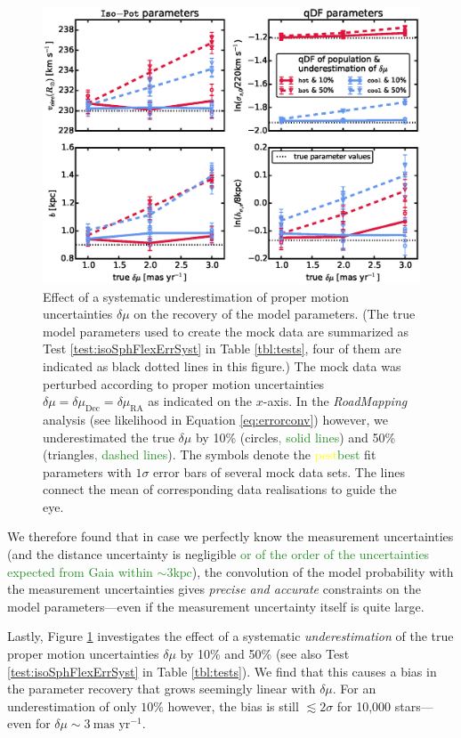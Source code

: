 \documentclass[iop,revtex4,numberedappendix,appendixfloats]{emulateapj}
\newcommand{\RM}{{\sl RoadMapping}}
\newcommand{\NEW}[1]{\textcolor{ForestGreen}{#1}}
\newcommand{\OLD}[1]{\textcolor{Yellow}{#1}}%
\begin{document}
\begin{figure}[!htbp]
\centering
\includegraphics[width=\columnwidth]{figs/isoSphFlexErrSyst_offset_vs_error.eps}
\caption{Effect of a systematic underestimation of proper motion uncertainties $\delta \mu$ on the recovery of the model parameters. (The true model parameters used to create the mock data are summarized as Test \ref{test:isoSphFlexErrSyst} in Table \ref{tbl:tests}, four of them are indicated as black dotted lines in this figure.) The mock data was perturbed according to proper motion uncertainties $\delta \mu = \delta \mu_\text{Dec} = \delta \mu_\text{RA}$ as indicated on the $x$-axis. In the \RM{} analysis (see likelihood in Equation \eqref{eq:errorconv}) however, we underestimated the true $\delta \mu$ by 10\% (circles\NEW{, solid lines}) and 50\% (triangles\NEW{, dashed lines}). The symbols denote the \OLD{pest}\NEW{best} fit parameters with $1\sigma$ error bars of several mock data sets. The lines connect the mean of corresponding data realisations to guide the eye.}
\label{fig:isoSphFlexErrSyst}
\end{figure}

We therefore found that in case we perfectly know the measurement uncertainties (and the distance uncertainty is negligible \NEW{or of the order of the uncertainties expected from Gaia within $\sim3\text{kpc}$}), the convolution of the model probability with the measurement uncertainties gives \emph{precise and accurate} constraints on the model parameters---even if the measurement uncertainty itself is quite large.

Lastly, Figure \ref{fig:isoSphFlexErrSyst} investigates the effect of a systematic \emph{underestimation} of the true proper motion uncertainties $\delta \mu$ by 10\% and 50\% (see also Test \ref{test:isoSphFlexErrSyst} in Table \ref{tbl:tests}). We find that this causes a bias in the parameter recovery that grows seemingly linear with $\delta \mu$. For an underestimation of only $10\%$ however, the bias is still $\lesssim 2 \sigma$ for 10,000 stars---even for $\delta \mu \sim 3~\text{mas yr}^{-1}$.
\end{document}
